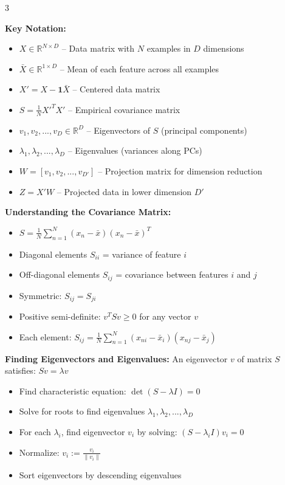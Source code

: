 \documentclass[10pt,landscape]{article}
\begin{document}
\begin{multicols}{3}
\begin{tcolorbox}[breakable, title=Principal Component Analysis (PCA), colback=pca, boxsep=1pt, left=1pt, right=1pt, top=1pt, bottom=1pt]
\textbf{Key Notation:}
\begin{itemize}[leftmargin=*,noitemsep,topsep=0pt]
    \item $X \in \mathbb{R}^{N \times D}$ -- Data matrix with $N$ examples in $D$ dimensions
    \item $\bar{X} \in \mathbb{R}^{1 \times D}$ -- Mean of each feature across all examples
    \item $X' = X - \mathbf{1}\bar{X}$ -- Centered data matrix
    \item $S = \frac{1}{N}X'^T X'$ -- Empirical covariance matrix
    \item $v_1, v_2, ..., v_D \in \mathbb{R}^D$ -- Eigenvectors of $S$ (principal components)
    \item $\lambda_1, \lambda_2, ..., \lambda_D$ -- Eigenvalues (variances along PCs)
    \item $W = [v_1, v_2, ..., v_{D'}]$ -- Projection matrix for dimension reduction
    \item $Z = X'W$ -- Projected data in lower dimension $D'$
\end{itemize}

\textbf{Understanding the Covariance Matrix:}
\begin{itemize}[leftmargin=*,noitemsep,topsep=0pt]
    \item $S = \frac{1}{N}\sum_{n=1}^N (x_n - \bar{x})(x_n - \bar{x})^T$
    \item Diagonal elements $S_{ii}$ = variance of feature $i$
    \item Off-diagonal elements $S_{ij}$ = covariance between features $i$ and $j$
    \item Symmetric: $S_{ij} = S_{ji}$
    \item Positive semi-definite: $v^T S v \geq 0$ for any vector $v$
    \item Each element: $S_{ij} = \frac{1}{N} \sum_{n=1}^N (x_{ni} - \bar{x}_i)(x_{nj} - \bar{x}_j)$
\end{itemize}

\textbf{Finding Eigenvectors and Eigenvalues:}
An eigenvector $v$ of matrix $S$ satisfies: $Sv = \lambda v$
\begin{itemize}[leftmargin=*,noitemsep,topsep=0pt]
    \item Find characteristic equation: $\det(S - \lambda I) = 0$
    \item Solve for roots to find eigenvalues $\lambda_1, \lambda_2, ..., \lambda_D$
    \item For each $\lambda_i$, find eigenvector $v_i$ by solving: $(S - \lambda_i I)v_i = 0$
    \item Normalize: $v_i := \frac{v_i}{\|v_i\|}$
    \item Sort eigenvectors by descending eigenvalues
\end{itemize}


\end{tcolorbox}
\end{multicols}
\end{document}
